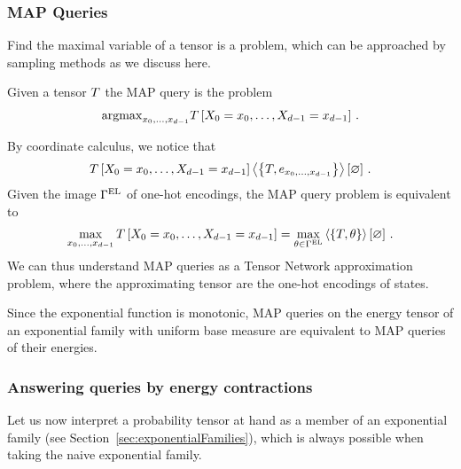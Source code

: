 \subsubsection{MAP Queries}

Find the maximal variable of a tensor is a problem, which can be approached by sampling methods as we discuss here.

\begin{definition}
	Given a tensor $T$ the MAP query is the problem 
	\begin{align}
		\mathrm{argmax}_{x_{0},\ldots,x_{d-1}} T\left[X_{0}=x_{0},\ldots,X_{d-1}=x_{d-1}\right] \, .
	\end{align}
\end{definition}


By coordinate calculus, we notice that
\begin{align}
	T\left[X_{0}=x_{0},\ldots,X_{d-1}=x_{d-1}\right] 
	\left\langle \left\{T, e_{x_{0},\ldots,x_{d-1}}\right\}\right\rangle \left[ \varnothing \right] \, .
\end{align}
Given the image $\Gamma^{\mathrm{EL}}$ of one-hot encodings, the MAP query problem is equivalent to 
\begin{align}
	\max_{x_{0},\ldots,x_{d-1}} T\left[X_{0}=x_{0},\ldots,X_{d-1}=x_{d-1}\right] 
	= \max_{\theta\in\Gamma^{\mathrm{EL}}} \left\langle \left\{T, \theta\right\}\right\rangle \left[ \varnothing \right] \, .
\end{align}
We can thus understand MAP queries as a Tensor Network approximation problem, where the approximating tensor are the one-hot encodings of states.

\begin{remark}
	Since the exponential function is monotonic, MAP queries on the energy tensor of an exponential family with uniform base measure are equivalent to MAP queries of their energies.
\end{remark}


\subsubsection{Answering queries by energy contractions}

Let us now interpret a probability tensor at hand as a member of an exponential family (see Section~\ref{sec:exponentialFamilies}), which is always possible when taking the naive exponential family.

